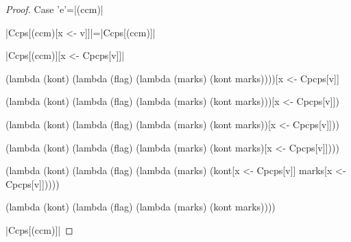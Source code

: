\begin{proof}{Case \scheme'e'=\scheme|(ccm)|}

\scheme|Ccps[(ccm)[x <- v]]|=\scheme|Ccps[(ccm)]|

\scheme|Ccps[(ccm)][x <- Cpcps[v]]|

\begin{schemeblock}
\begin{schemedisplay}
(lambda (kont)
  (lambda (flag)
    (lambda (marks)
      (kont marks))))[x <- Cpcps[v]]
\end{schemedisplay}
\end{schemeblock}

\begin{schemeblock}
\begin{schemedisplay}
(lambda (kont)
  (lambda (flag)
    (lambda (marks)
      (kont marks)))[x <- Cpcps[v]])
\end{schemedisplay}
\end{schemeblock}

\begin{schemeblock}
\begin{schemedisplay}
(lambda (kont)
  (lambda (flag)
    (lambda (marks)
      (kont marks))[x <- Cpcps[v]]))
\end{schemedisplay}
\end{schemeblock}

\begin{schemeblock}
\begin{schemedisplay}
(lambda (kont)
  (lambda (flag)
    (lambda (marks)
      (kont marks)[x <- Cpcps[v]])))
\end{schemedisplay}
\end{schemeblock}

\begin{schemeblock}
\begin{schemedisplay}
(lambda (kont)
  (lambda (flag)
    (lambda (marks)
      (kont[x <- Cpcps[v]] marks[x <- Cpcps[v]]))))
\end{schemedisplay}
\end{schemeblock}

\begin{schemeblock}
\begin{schemedisplay}
(lambda (kont)
  (lambda (flag)
    (lambda (marks)
      (kont marks))))
\end{schemedisplay}
\end{schemeblock}

\noindent
\scheme|Ccps[(ccm)]|


\end{proof}
